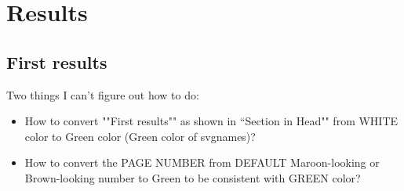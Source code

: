 \documentclass[xcolor=svgnames,t] {beamer}
\begin{document}
  \section{Results} 
  \subsection{First results}

    \begin{frame}
        Two things I can't figure out how to do:

        \begin{itemize}
            \item   How to convert ""First results"" as shown in ``Section in Head"" from WHITE color to Green color (Green color of svgnames)?
            \item How to convert the PAGE NUMBER from DEFAULT Maroon-looking or Brown-looking number to Green to be consistent with GREEN color?
        \end{itemize}
    \end{frame}
\end{document}
